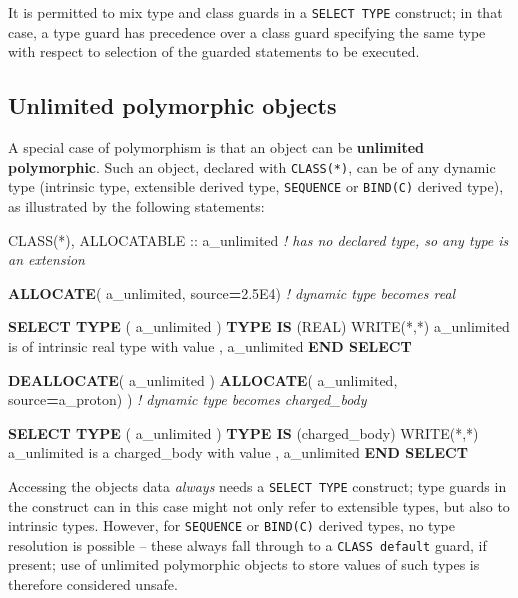 \documentclass[]{scrartcl}
\newenvironment{Shaded}{}{}
\newcommand{\CommentTok}[1]{\textcolor[rgb]{0.38,0.63,0.69}{\textit{#1}}}
\newcommand{\DataTypeTok}[1]{\textcolor[rgb]{0.56,0.13,0.00}{#1}}
\newcommand{\FloatTok}[1]{\textcolor[rgb]{0.25,0.63,0.44}{#1}}
\newcommand{\FunctionTok}[1]{\textcolor[rgb]{0.02,0.16,0.49}{#1}}
\newcommand{\KeywordTok}[1]{\textcolor[rgb]{0.00,0.44,0.13}{\textbf{#1}}}
\newcommand{\NormalTok}[1]{#1}
\newcommand{\StringTok}[1]{\textcolor[rgb]{0.25,0.44,0.63}{#1}}
\begin{document}
It is permitted to mix type and class guards in a \texttt{SELECT\ TYPE}
construct; in that case, a type guard has precedence over a class guard
specifying the same type with respect to selection of the guarded
statements to be executed.

\subsection{Unlimited polymorphic
objects}\label{unlimited-polymorphic-objects}

A special case of polymorphism is that an object can be
\textbf{unlimited polymorphic}. Such an object, declared with
\texttt{CLASS(*)}, can be of any dynamic type (intrinsic type,
extensible derived type, \texttt{SEQUENCE} or \texttt{BIND(C)} derived
type), as illustrated by the following statements:

\begin{Shaded}
\begin{Highlighting}[]
\DataTypeTok{CLASS(*)}\NormalTok{, }\DataTypeTok{ALLOCATABLE} \DataTypeTok{::}\NormalTok{ a\_unlimited  }\CommentTok{! has no declared type, so any type is an extension}

\KeywordTok{ALLOCATE}\NormalTok{( a\_unlimited, source}\KeywordTok{=}\FloatTok{2.5}\NormalTok{E4)  }\CommentTok{! dynamic type becomes real}

\KeywordTok{SELECT TYPE}\NormalTok{ ( a\_unlimited )}
\KeywordTok{TYPE IS}\NormalTok{ (}\DataTypeTok{REAL}\NormalTok{)}
   \FunctionTok{WRITE(*}\NormalTok{,}\FunctionTok{*)} \StringTok{\textquotesingle{}a\_unlimited is of intrinsic real type with value \textquotesingle{}}\NormalTok{, a\_unlimited}
\KeywordTok{END SELECT}

\KeywordTok{DEALLOCATE}\NormalTok{( a\_unlimited )}
\KeywordTok{ALLOCATE}\NormalTok{( a\_unlimited, source}\KeywordTok{=}\NormalTok{a\_proton) )  }\CommentTok{! dynamic type becomes charged\_body}

\KeywordTok{SELECT TYPE}\NormalTok{ ( a\_unlimited )}
\KeywordTok{TYPE IS}\NormalTok{ (charged\_body)}
   \FunctionTok{WRITE(*}\NormalTok{,}\FunctionTok{*)} \StringTok{\textquotesingle{}a\_unlimited is a charged\_body with value \textquotesingle{}}\NormalTok{, a\_unlimited}
\KeywordTok{END SELECT}
\end{Highlighting}
\end{Shaded}

Accessing the object\textquotesingle s data \emph{always} needs a
\texttt{SELECT\ TYPE} construct; type guards in the construct can in
this case might not only refer to extensible types, but also to
intrinsic types. However, for \texttt{SEQUENCE} or \texttt{BIND(C)}
derived types, no type resolution is possible -- these always fall
through to a \texttt{CLASS\ default} guard, if present; use of unlimited
polymorphic objects to store values of such types is therefore
considered unsafe.
\end{document}
